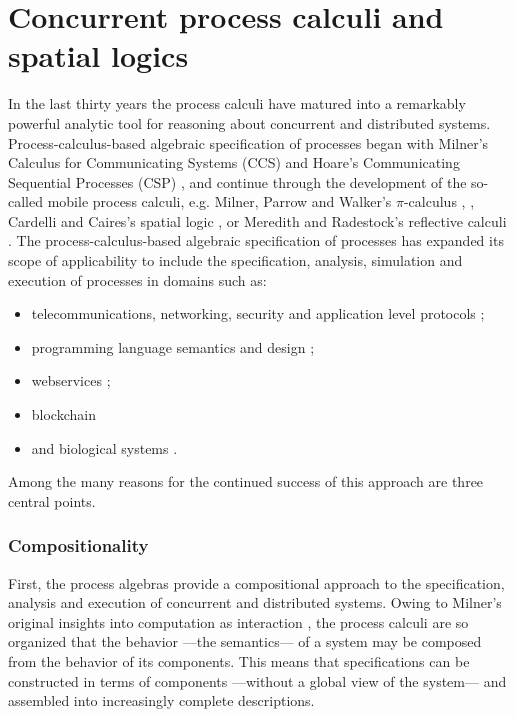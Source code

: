 \section{Concurrent process calculi and spatial logics }\label{sec:concurrent_process_calculi_and_spatial_logics_} %
In the last thirty years the process calculi have matured into a
remarkably powerful analytic tool for reasoning about concurrent and
distributed systems. Process-calculus-based algebraic specification of
processes began with Milner's Calculus for Communicating Systems (CCS)
\cite{DBLP:books/sp/Milner80} and Hoare's Communicating Sequential Processes
(CSP) \cite{DBLP:books/ph/Hoare85}, and continue
through the development of the so-called mobile process calculi,
e.g. Milner, Parrow and Walker's $\pi$-calculus \cite{DBLP:journals/iandc/MilnerPW92a}, \cite{DBLP:journals/iandc/MilnerPW92b},
Cardelli and Caires's spatial logic \cite{DBLP:conf/fossacs/Caires04} \cite{DBLP:journals/iandc/CairesC03} \cite{DBLP:journals/tcs/CairesC04}, or Meredith and Radestock's reflective calculi
\cite{DBLP:journals/entcs/MeredithR05} \cite{DBLP:conf/tgc/MeredithR05}. The process-calculus-based
algebraic specification of processes has expanded its scope of
applicability to include the specification, analysis, simulation and
execution of processes in domains such as:

\begin{itemize}
\item telecommunications, networking, security and application level protocols
\cite{DBLP:conf/popl/AbadiB02} 
\cite{DBLP:journals/tcs/AbadiB03} 
\cite{DBLP:conf/epew/BrownLM05} 
\cite{DBLP:conf/fossacs/LaneveZ05}; 
\item programming language semantics and design
\cite{DBLP:conf/epew/BrownLM05}
\cite{djoin}
\cite{DBLP:conf/afp/FournetFMS02}
\cite{DBLP:journals/toplas/SewellWU10};
\item webservices
\cite{DBLP:conf/epew/BrownLM05}
\cite{DBLP:conf/fossacs/LaneveZ05}
\cite{DBLP:conf/wise/Meredith03};
\item{blockchain}
  \cite{meredith_2017}
\item and biological systems
\cite{DBLP:conf/cmsb/Cardelli04}
\cite{DBLP:conf/esop/DanosL03}
\cite{DBLP:conf/psb/RegevSS01}
\cite{DBLP:journals/ipl/PriamiRSS01}.
\end{itemize}

Among the many reasons for the continued success of this approach are
three central points.

\subsubsection{Compositionality} First, the process algebras provide a
compositional approach to the specification, analysis and execution of
concurrent and distributed systems. Owing to Milner's original
insights into computation as interaction
\cite{DBLP:journals/cacm/Milner93}, the process calculi are so
organized that the behavior ---the semantics--- of a system may be
composed from the behavior of its components. This means that
specifications can be constructed in terms of components ---without a
global view of the system--- and assembled into increasingly complete
descriptions.


